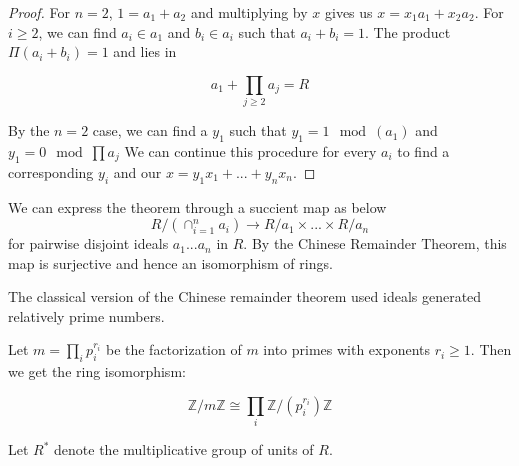 \documentclass[main.tex]{subfiles}
\begin{document}
\begin{proof}
 For $n=2$, $1 = a_1 + a_2$ and multiplying by $x$ gives us $x = x_1a_1 + x_2a_2$.
 For $i \geq 2$, we can find $a_i \in a_1$ and $b_i \in a_i$ such that $a_i + b_i = 1$. The product $\Pi(a_i+b_i) = 1$ and lies in 
 
 $$ a_1 + \prod_{j \geq 2} a_j = R$$
 
 By the $n = 2$ case, we can find a $y_1$ such that 
 $y_1 = 1 \mod (a_1)$ and $y_1 = 0 \mod \prod a_j$ 
 We can continue this procedure for every $a_i$ to find a corresponding $y_i$ and our $x = y_1x_1 + ... + y_nx_n$.

\end{proof}

We can express the theorem through a succient map as below
$$ R / (\cap_{i=1}^n a_i) \rightarrow R /a_1 \times ... \times R / a_n$$
for pairwise disjoint ideals $a_1...a_n$ in $R$. By the Chinese Remainder Theorem, this map is surjective and hence an isomorphism of rings.

The classical version of the Chinese remainder theorem used ideals generated relatively prime numbers. 

Let $m = \prod_i p_i^{r_i}$ be the factorization of $m$ into primes with exponents $r_i \geq 1$. Then we get the ring isomorphism:

$$\mathbb{Z}/m\mathbb{Z} \cong \prod_i \mathbb{Z}/(p_i^{r_i})\mathbb{Z}$$

Let $R^*$ denote the multiplicative group of units of $R$.

 
\end{document}
